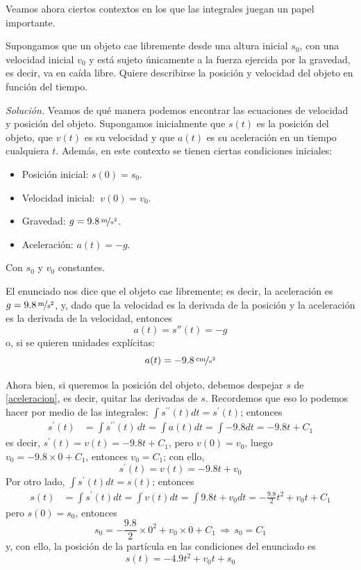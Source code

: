 Veamos ahora ciertos contextos en los que las integrales juegan un papel importante.

\begin{ejemplo}
  Supongamos que un objeto cae libremente desde una altura inicial $s_{0}$, con una velocidad inicial $v_{0}$ y está sujeto únicamente a la fuerza ejercida por la gravedad, es decir, va en caída libre. Quiere describirse la posición y velocidad del objeto en función del tiempo.
\end{ejemplo}

\emph{Solución.} Veamos de qué manera podemos encontrar las ecuaciones de velocidad y posición del objeto. Supongamos inicialmente que $s(t)$ es la posición del objeto, que $v(t)$ es su velocidad y que $a(t)$ es su aceleración en un tiempo cualquiera $t$. Además, en este contexto se tienen ciertas condiciones iniciales:

\begin{itemize}
  \item Posición inicial: $s(0)=s_{0}$.
  \item Velocidad inicial: $\ v(0)=v_{0}$.
  \item Gravedad: $g=9.8\,\nicefrac{\text{m}}{\text{s}^{2}}$.
  \item Aceleración: $a(t)=-g$.
\end{itemize}

Con $s_0$ y $v_0$ constantes.

El enunciado nos dice que el objeto cae libremente; es decir, la aceleración es $g=9.8\,\nicefrac{\text{m}}{\text{s}^{2}}$, y, dado que la velocidad es la derivada de la posición y la aceleración es la derivada de la velocidad, entonces
\begin{equation*}
  a(t)=s''(t)=-g
\end{equation*}
o, si se quieren unidades explícitas:
\begin{equation}\label{aceleracion}
  a(t)=-9.8\,\nicefrac{\text{cm}}{\text{s}^2}
\end{equation}

Ahora bien, si queremos la posición del objeto, debemos despejar $s$ de \eqref{aceleracion}, es decir, quitar las derivadas de $s$. Recordemos que eso lo podemos hacer por medio de las integrales: $\displaystyle{\int s^{\prime \prime} (t)dt=s^\prime (t)}$; entonces
\begin{align*}
  s^\prime (t)&=\int s^{\prime \prime} (t)\,dt=\int a(t)dt=\int -9.8dt=-9.8 t+C_1
\end{align*}
es decir, $s^\prime(t)=v(t)=-9.8t+C_1$, pero $v(0)=v_{0}$, luego $v_0=-9.8\times 0+C_1$, entonces $v_0=C_1$; con ello,
\[
  s^\prime(t)=v(t)=-9.8t+v_0
\]
Por otro lado, $\displaystyle{\int s^\prime (t)dt=s(t)}$; entonces
\begin{align*}
  s(t)&=\int s^\prime (t)dt=\int v(t)dt=\int 9.8t+v_{0}dt=-\frac{9.8}{2}t^{2}+v_{0}t+C_1
\end{align*}
pero $s(0)=s_0$, entonces
\[
  s_0=-\frac{9.8}{2}\times 0^{2}+v_{0}\times 0+C_1\, \Rightarrow \, s_0=C_1
\]
y, con ello, la posición de la partícula en las condiciones del enunciado es
\begin{equation}\label{posicion}
  s(t)=-4.9t^{2}+v_{0}t+s_{0}
\end{equation}

